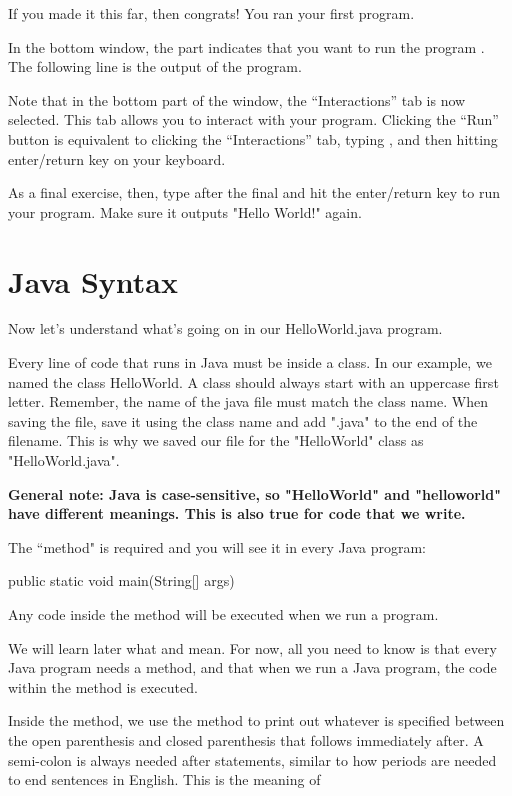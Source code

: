 If you made it this far, then congrats! You ran your first program.

In the bottom window, the  part indicates that you want to run the program . The following line is the output of the program. 

Note that in the bottom part of the window, the ``Interactions'' tab is now
selected. This tab allows you to interact with your program. Clicking
the ``Run'' button is equivalent to clicking the ``Interactions'' tab, typing
, and then hitting enter/return key on your keyboard.

As a final exercise, then, type  after the final \ic{>} and
hit the enter/return key to run your program. Make sure it outputs "Hello World!" again. 

\section{Java Syntax} 

Now let's understand what's going on in our HelloWorld.java program. 

Every line of code that runs in Java must be inside a class. In our example, we named the class HelloWorld. A class should always start with an uppercase first letter. Remember, the name of the java file must match the class name. When saving the file, save it using the class name and add ".java" to the end of the filename. This is why we saved our file for the "HelloWorld" class as "HelloWorld.java". 

\textbf{General note: Java is case-sensitive, so "HelloWorld" and "helloworld" have different meanings. This is also true for code that we write.} 

The  ``method" is required and you will see it in every Java program: 

\begin{code}
public static void main(String[] args)
\end{code}

Any code inside the  method will be executed when we run a program. 

We will learn later what
 and  mean. For now, all you
need to know is that every Java program needs a  method, and that when we run a Java program, the code within the  method is executed. 

Inside the  method, we use the  method to print out
whatever is specified between the open parenthesis \ic{(} and closed
parenthesis\ic{ )} that follows immediately after. A semi-colon is always needed after statements, similar to how periods are needed to end sentences in English. This is the meaning of 

